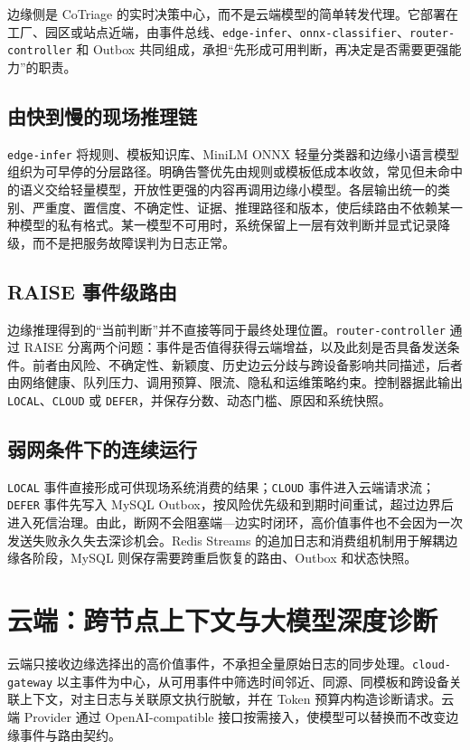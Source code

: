 边缘侧是 CoTriage 的实时决策中心，而不是云端模型的简单转发代理。它部署在工厂、园区或站点近端，由事件总线、\texttt{edge-infer}、\texttt{onnx-classifier}、\texttt{router-controller} 和 Outbox 共同组成，承担“先形成可用判断，再决定是否需要更强能力”的职责。

\subsection{由快到慢的现场推理链}

\texttt{edge-infer} 将规则、模板知识库、MiniLM ONNX 轻量分类器和边缘小语言模型组织为可早停的分层路径。明确告警优先由规则或模板低成本收敛，常见但未命中的语义交给轻量模型，开放性更强的内容再调用边缘小模型。各层输出统一的类别、严重度、置信度、不确定性、证据、推理路径和版本，使后续路由不依赖某一种模型的私有格式。某一模型不可用时，系统保留上一层有效判断并显式记录降级，而不是把服务故障误判为日志正常。

\subsection{RAISE 事件级路由}

边缘推理得到的“当前判断”并不直接等同于最终处理位置。\texttt{router-controller} 通过 RAISE 分离两个问题：事件是否值得获得云端增益，以及此刻是否具备发送条件。前者由风险、不确定性、新颖度、历史边云分歧与跨设备影响共同描述，后者由网络健康、队列压力、调用预算、限流、隐私和运维策略约束。控制器据此输出 \texttt{LOCAL}、\texttt{CLOUD} 或 \texttt{DEFER}，并保存分数、动态门槛、原因和系统快照。

\subsection{弱网条件下的连续运行}

\texttt{LOCAL} 事件直接形成可供现场系统消费的结果；\texttt{CLOUD} 事件进入云端请求流；\texttt{DEFER} 事件先写入 MySQL Outbox，按风险优先级和到期时间重试，超过边界后进入死信治理。由此，断网不会阻塞端—边实时闭环，高价值事件也不会因为一次发送失败永久失去深诊机会。Redis Streams 的追加日志和消费组机制用于解耦边缘各阶段\cite{redisstreams}，MySQL 则保存需要跨重启恢复的路由、Outbox 和状态快照。

\section{云端：跨节点上下文与大模型深度诊断}

云端只接收边缘选择出的高价值事件，不承担全量原始日志的同步处理。\texttt{cloud-gateway} 以主事件为中心，从可用事件中筛选时间邻近、同源、同模板和跨设备关联上下文，对主日志与关联原文执行脱敏，并在 Token 预算内构造诊断请求。云端 Provider 通过 OpenAI-compatible 接口按需接入，使模型可以替换而不改变边缘事件与路由契约。

